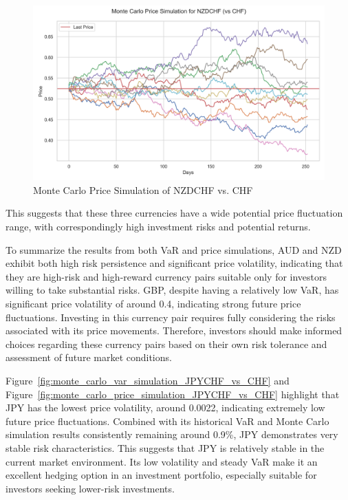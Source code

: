 \documentclass[a4paper, 12pt]{article}
\begin{document}
\begin{figure}[h]
    \centering
    \includegraphics[width=0.75\linewidth]{reports/figures/monte_carlo_price_simulation_NZDCHF_vs_CHF.png}
    \caption{Monte Carlo Price Simulation of NZDCHF vs. CHF} \label{fig:monte_carlo_price_simulation_NZDCHF_vs_CHF}
\end{figure}
This suggests that these three currencies have a wide potential price fluctuation range, with correspondingly high investment risks and potential returns.

To summarize the results from both VaR and price simulations, AUD and NZD exhibit both high risk persistence and significant price volatility, indicating that they are high-risk and high-reward currency pairs suitable only for investors willing to take substantial risks. GBP, despite having a relatively low VaR, has significant price volatility of around 0.4, indicating strong future price fluctuations. Investing in this currency pair requires fully considering the risks associated with its price movements. Therefore, investors should make informed choices regarding these currency pairs based on their own risk tolerance and assessment of future market conditions.

Figure~\ref{fig:monte_carlo_var_simulation_JPYCHF_vs_CHF} and Figure~\ref{fig:monte_carlo_price_simulation_JPYCHF_vs_CHF} highlight that JPY has the lowest price volatility, around 0.0022, indicating extremely low future price fluctuations. Combined with its historical VaR and Monte Carlo simulation results consistently remaining around 0.9\%, JPY demonstrates very stable risk characteristics. This suggests that JPY is relatively stable in the current market environment. Its low volatility and steady VaR make it an excellent hedging option in an investment portfolio, especially suitable for investors seeking lower-risk investments.
\end{document}

